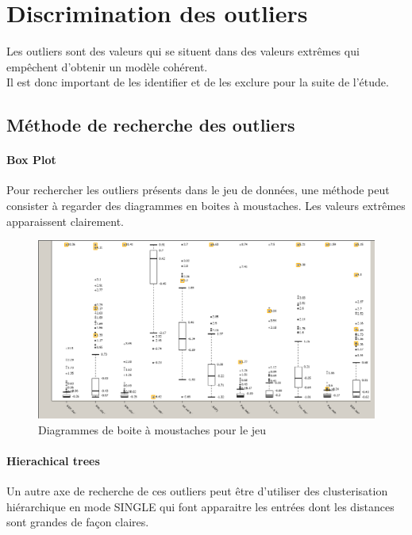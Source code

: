 \section{Discrimination des outliers}
Les outliers sont des valeurs qui se situent dans des valeurs extrêmes qui empêchent d'obtenir un modèle cohérent.\\
Il est donc important de les identifier et de les exclure pour la suite de l'étude.

\subsection{Méthode de recherche des outliers}

\paragraph{Box Plot}
Pour rechercher les outliers présents dans le jeu de données, une méthode peut consister à regarder des diagrammes en boites à moustaches.
Les valeurs extrêmes apparaissent clairement.

\begin{figure}[H]
	\begin{center}
		\includegraphics[scale=0.5]{Image/BoxplotOutlierNoMissing2}
		\caption{Diagrammes de boite à moustaches pour le jeu \jeuc}
	\end{center}
\end{figure}

\paragraph{Hierachical trees}
Un autre axe de recherche de ces outliers peut être d'utiliser des clusterisation hiérarchique en mode SINGLE qui font apparaitre les entrées dont les distances sont grandes de façon claires.


